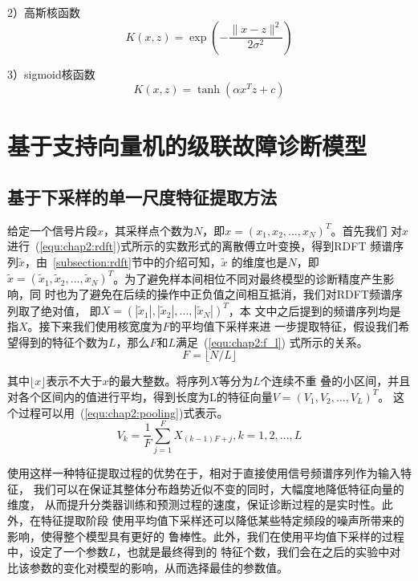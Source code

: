 2）高斯核函数
\begin{equation}
  \label{equ:chap2:gauss_kernel}
  K(x,z)=\exp\left(-\frac{\|x-z\|^2}{2\sigma^2}\right)
\end{equation}

3）sigmoid核函数
\begin{equation}
  \label{equ:chap2:sigmoid_kernel}
  K(x,z)=\tanh(\alpha x^Tz+c)
\end{equation}

\section{基于支持向量机的级联故障诊断模型}

\subsection{基于下采样的单一尺度特征提取方法}

给定一个信号片段$x$，其采样点个数为$N$，即$x=(x_1,x_2,...,x_N)^T$。首先我们
对$x$进行~(\ref{equ:chap2:rdft})式所示的实数形式的离散傅立叶变换，得到RDFT
频谱序列$\widetilde{x}$，由~\ref{subsection:rdft}节中的介绍可知，$\widetilde{x}$
的维度也是$N$，即$\widetilde{x} = (\widetilde{x}_1, \widetilde{x}_2, ...,
\widetilde{x}_N)^T$。为了避免样本间相位不同对最终模型的诊断精度产生影响，同
时也为了避免在后续的操作中正负值之间相互抵消，我们对RDFT频谱序列取了绝对值，
即$X = (|\widetilde{x}_1|, |\widetilde{x}_2|, ..., |\widetilde{x}_N|)^T$，本
文中之后提到的频谱序列均是指$X$。接下来我们使用核宽度为$F$的平均值下采样来进
一步提取特征，假设我们希望得到的特征个数为$L$，那么$F$和$L$满足~(\ref{equ:chap2:f_l})
式所示的关系。
\begin{equation}
  \label{equ:chap2:f_l}
  F=\lfloor N/L \rfloor
\end{equation}

其中$\lfloor x \rfloor$表示不大于$x$的最大整数。将序列$X$等分为$L$个连续不重
叠的小区间，并且对各个区间内的值进行平均，得到长度为L的特征向量$V=(V_1,V_2,...,V_L)^T$。
这个过程可以用~(\ref{equ:chap2:pooling})式表示。
\begin{equation}
  \label{equ:chap2:pooling}
  V_k=\frac{1}{F}\sum_{j=1}^{F}X_{(k-1)F+j}, k=1,2,...,L
\end{equation}

使用这样一种特征提取过程的优势在于，相对于直接使用信号频谱序列作为输入特征，
我们可以在保证其整体分布趋势近似不变的同时，大幅度地降低特征向量的维度，
从而提升分类器训练和预测过程的速度，保证诊断过程的是实时性。此外，在特征提取阶段
使用平均值下采样还可以降低某些特定频段的噪声所带来的影响，使得整个模型具有更好的
鲁棒性。此外，我们在使用平均值下采样的过程中，设定了一个参数$L$，也就是最终得到的
特征个数，我们会在之后的实验中对比该参数的变化对模型的影响，从而选择最佳的参数值。

